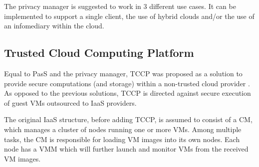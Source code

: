 \documentclass[pdftex,english,10pt,b5paper,twoside]{book}
\begin{document}
The privacy manager is suggested to work in 3 different use cases. It can be
implemented to support a single client, the use of hybrid clouds and/or the use of an
infomediary within the cloud.


\subsection{Trusted Cloud Computing Platform}
Equal to PasS and the privacy manager, \ac{TCCP} was proposed as a solution to
provide secure computations (and storage) within a non-trusted cloud provider
\cite{tccp}. As opposed to the previous solutions, TCCP is directed against secure
execution of guest VMs outsourced to IaaS providers. 

The original IaaS structure, before adding TCCP, is assumed to consist of a
\ac{CM}, which manages a cluster of nodes running one or more VMs. Among
multiple tasks, the CM is responsible for loading VM images into its own nodes.
Each node has a \ac{VMM} which will further launch and monitor VMs from the
received VM images.
\end{document}
